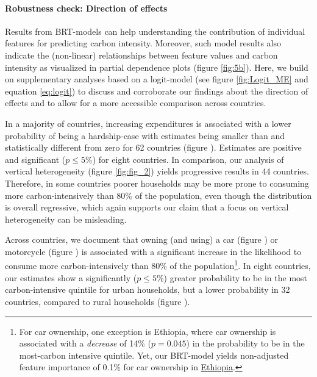 \documentclass[12pt, a4paper]{article}
\begin{document}
\paragraph{Robustness check: Direction of effects}
Results from BRT-models can help understanding the contribution of individual features for predicting carbon intensity. Moreover, such model results also indicate the (non-linear) relationships between feature values and carbon intensity as visualized in partial dependence plots (figure \ref{fig:5b}). Here, we build on supplementary analyses based on a logit-model (see figure \ref{fig:Logit_ME} and equation \ref{eq:logit}) to discuss and corroborate our findings about the direction of effects and to allow for a more accessible comparison across countries.

In a majority of countries, increasing expenditures is associated with a lower probability of being a hardship-case with estimates being smaller than and statistically different from zero for 62 countries (figure ). Estimates are positive and significant ($p\leq 5\%$) for eight countries. In comparison, our analysis of vertical heterogeneity (figure \ref{fig:fig_2}) yields progressive results in 44 countries. Therefore, in some countries poorer households may be more prone to consuming more carbon-intensively than 80\% of the population, even though the distribution is overall regressive, which again supports our claim that a focus on vertical heterogeneity can be misleading.

Across countries, we document that owning (and using) a car (figure ) or motorcycle (figure ) is associated with a significant increase in the likelihood to consume more carbon-intensively than 80\% of the population\footnote{For car ownership, one exception is Ethiopia, where car ownership is associated with a \textit{decrease} of 14\% ($p=0.045$) in the probability to be in the most-carbon intensive quintile. Yet, our BRT-model yields non-adjusted feature importance of 0.1\% for car ownership in \hyperref[fig:5b_ETH]{Ethiopia}.}. In eight countries, our estimates show a significantly ($p\leq 5\%$) greater probability to be in the most carbon-intensive quintile for urban households, but a lower probability in 32 countries, compared to rural households (figure ).
\end{document}
